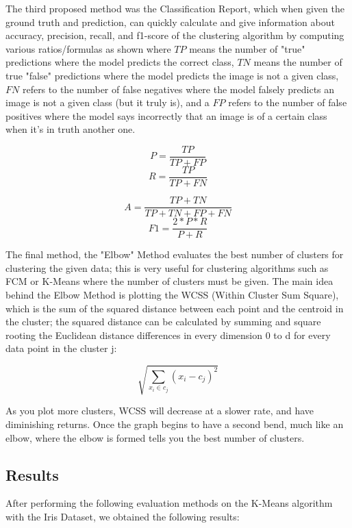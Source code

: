 \documentclass[10pt,twocolumn]{article}
\begin{document}
The third proposed method was the Classification Report, which when given the ground truth and prediction, can quickly calculate and give information about accuracy, precision, recall, and f1-score of the clustering algorithm by computing various ratios/formulas as shown where \(TP\) means the number of "true" predictions where the model predicts the correct class, \(TN\) means the number of true "false" predictions where the model predicts the image is not a given class, \(FN\) refers to the number of false negatives where the model falsely predicts an image is not a given class (but it truly is), and a \(FP\) refers to the number of false positives where the model says incorrectly that an image is of a certain class when it's in truth another one.

\[P = \frac{TP}{TP + FP}\]
\[R = \frac{TP}{TP + FN}\]

\[A = \frac{TP + TN}{TP + TN + FP + FN}\]
\[F1 = \frac{2 * P * R}{P + R}\]

The final method, the "Elbow" Method evaluates the best number of clusters for clustering the given data; this is very useful for clustering algorithms such as FCM or K-Means where the number of clusters must be given. The main idea behind the Elbow Method is plotting the WCSS (Within Cluster Sum Square), which is the sum of the squared distance between each point and the centroid in the cluster; the squared distance can be calculated by summing and square rooting the Euclidean distance differences in every dimension 0 to d for every data point in the cluster j:

\[\sqrt{\sum_{x_i \in c_j}(x_{i} - c_{j})^2}\]

As you plot more clusters, WCSS will decrease at a slower rate, and have diminishing returns. Once the graph begins to have a second bend, much like an elbow, where the elbow is formed tells you the best number of clusters.

\subsection{Results}

After performing the following evaluation methods on the K-Means algorithm with the Iris Dataset, we obtained the following results:
\end{document}
